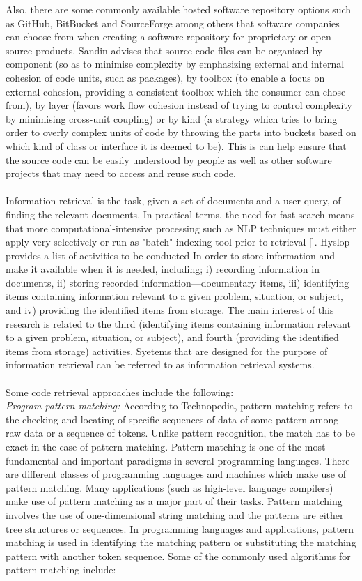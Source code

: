 \documentclass[a4paper]{article}
\begin{document}
Also, there are some commonly available hosted software repository options such as GitHub, BitBucket and SourceForge among others that software companies can choose from when creating a software repository for proprietary or open-source products. Sandin advises that source code files can be organised by component (so as to minimise complexity by emphasizing external and internal cohesion of code units, such as packages), by toolbox (to enable a focus on external cohesion, providing a consistent toolbox which the consumer can chose from), by layer (favors work flow cohesion instead of trying to control complexity by minimising cross-unit coupling) or by kind (a strategy which tries to bring order to overly complex units of code by throwing the parts into buckets based on which kind of class or interface it is deemed to be). This is can help ensure that the source code can be easily understood by people as well as other software projects that may need to access and reuse such code. \\ \\
Information retrieval is the task, given a set of documents and a user query, of finding the relevant documents.  In practical terms, the need for fast search means that more computational-intensive processing such as NLP techniques must either apply very selectively or run as "batch" indexing tool prior to retrieval []. Hyslop provides a list of activities to be conducted In order to store information and make it available when it is needed,  including; i) recording information in documents, ii) storing recorded information—documentary items, iii) identifying items containing information relevant to a given problem, situation, or subject, and iv) providing the identified items from storage. The main interest of this research is related to the third (identifying items containing information relevant to a given problem, situation, or subject), and fourth (providing the identified items from storage) activities. Syetems that are designed for the purpose of information retrieval can be referred to as information retrieval systems. \\ \\
Some code retrieval approaches include the following: \\
\textit{Program pattern matching:}
According to Technopedia, pattern matching refers to the checking and locating of specific sequences of data of some pattern among raw data or a sequence of tokens. Unlike pattern recognition, the match has to be exact in the case of pattern matching. Pattern matching is one of the most fundamental and important paradigms in several programming languages. There are different classes of programming languages and machines which make use of pattern matching. Many applications (such as high-level language compilers) make use of pattern matching as a major part of their tasks. Pattern matching involves the use of one-dimensional string matching and the patterns are either tree structures or sequences.  In programming languages and applications, pattern matching is used in identifying the matching pattern or substituting the matching pattern with another token sequence. Some of the commonly used algorithms for pattern matching include:  \\ \\
\end{document}
